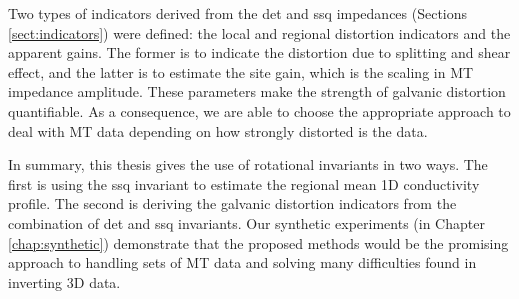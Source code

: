 
	Two types of indicators derived from the det and ssq impedances (Sections \ref{sect:indicators}) were defined: the local and regional distortion indicators and the apparent gains. The former is to indicate the distortion due to splitting and shear effect, and the latter is to estimate the site gain, which is the scaling in MT impedance amplitude. 
	These parameters make the strength of galvanic distortion quantifiable. 
	As a consequence, we are able to choose the appropriate approach to deal with MT data depending on how strongly distorted is the data.
	

	In summary, this thesis gives the use of rotational invariants in two ways. The first is using the ssq invariant to estimate the regional mean 1D conductivity profile.
	The second is deriving the galvanic distortion indicators from the combination of det and ssq invariants. 
	Our synthetic experiments (in Chapter \ref{chap:synthetic}) demonstrate that the proposed methods would be the promising approach to handling sets of MT data and solving many difficulties found in inverting 3D data.
	
